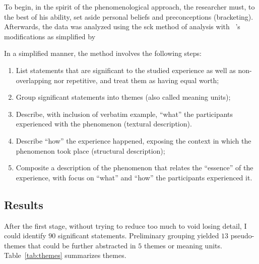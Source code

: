 
To begin, in the spirit of the phenomenological approach, the researcher must, to the best of his ability, set aside personal beliefs and preconceptions (\ie bracketing).
Afterwards, the data was analyzed using the \gls{sck} method of analysis with \citeauthor{moustakas1994phenomenological}~\cite{moustakas1994phenomenological}'s modifications as simplified by \citeauthor{creswell2016qualitative}~\cite[Chapter~8]{creswell2016qualitative}

In a simplified manner, the method involves the following steps:
\begin{enumerate}
	\item List statements that are significant to the studied experience as well as non-overlapping nor repetitive, and treat them as having equal worth;
	\item Group significant statements into themes (also called meaning units);
	\item Describe, with inclusion of verbatim example, ``what'' the participants experienced with the phenomenon (textural description).
	\item Describe ``how'' the experience happened, exposing the context in which the phenomenon took place (structural description);
	\item Composite a description of the phenomenon that relates the ``essence'' of the experience, with focus on ``what'' and ``how'' the participants experienced it. 
\end{enumerate}

\subsection{Results}
After the first stage, without trying to reduce too much to void losing detail, I could identify $90$ significant statements.
Preliminary grouping yielded $13$ pseudo-themes that could be further abstracted in $5$ themes or meaning units.
Table~\ref{tab:themes} summarizes themes.


